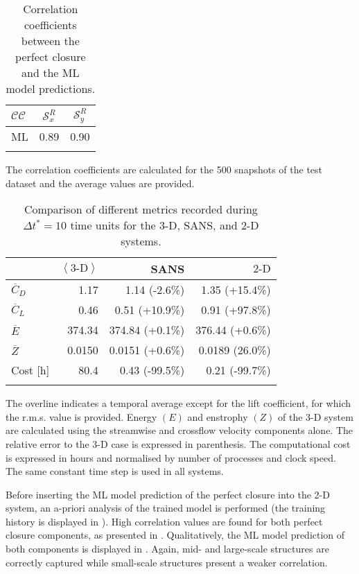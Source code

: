 \documentclass[../main.tex]{subfiles}
\begin{document}
\begin{table}[t]
\centering
\caption{Correlation coefficients between the perfect closure and the ML model predictions.}
\begin{tabular}{lcc}
\toprule
$\mathcal{CC}$ & $\mathcal{S}^R_x$ & $\mathcal{S}^R_y$ \\
\midrule
ML & 0.89 & 0.90\\
\bottomrule \label{tab:ML_SR_a-priori}
\end{tabular}

{\footnotesize The correlation coefficients are calculated for the 500 snapshots of the test dataset and the average values are provided. \par}
\end{table}
\begin{table}[t]
\centering
\caption{Comparison of different metrics recorded during $\Delta t^*=10$ time units for the 3-D, SANS, and 2-D systems.}
\begin{tabular}{lrrr}
\toprule
 &$\left\langle 3\text{-}\mathrm{D} \right\rangle$ & SANS & $2\text{-}\mathrm{D}$\\
\midrule
$\overline{C}_D$ & 1.17 & 1.14 (-2.6\%)& 1.35 (+15.4\%)\\
$\overline{C}_L$ & 0.46 & 0.51 (+10.9\%) & 0.91 (+97.8\%)\\
$\overline{E}$ & 374.34 & 374.84 (+0.1\%) & 376.44 (+0.6\%) \\
$\overline{Z}$ & 0.0150 & 0.0151 (+0.6\%) & 0.0189 (26.0\%) \\
Cost [h] & 80.4 & 0.43 (-99.5\%) & 0.21 (-99.7\%) \\
\bottomrule
\label{tab:ML_a-posteriori}
\end{tabular}

{\footnotesize The overline indicates a temporal average except for the lift coefficient, for which the r.m.s. value is provided.
Energy $(E)$ and enstrophy $(Z)$ of the 3-D system are calculated using the streamwise and crossflow velocity components alone.
The relative error to the 3-D case is expressed in parenthesis.
The computational cost is expressed in hours and normalised by number of processes and clock speed.
The same constant time step is used in all systems.}
\end{table}

Before inserting the ML model prediction of the perfect closure into the 2-D system, an a-priori analysis of the trained model is performed (the training history is displayed in ).
High correlation values are found for both perfect closure components, as presented in .
Qualitatively, the ML model prediction of both components is displayed in .
Again, mid- and large-scale structures are correctly captured while small-scale structures present a weaker correlation.
\end{document}
